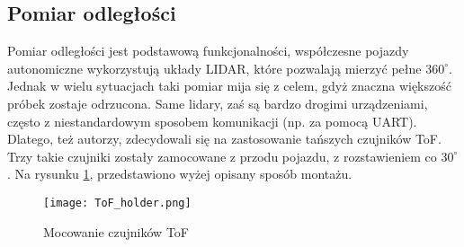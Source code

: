 
    \subsection{Pomiar odległości}
        Pomiar odległości jest podstawową funkcjonalności, współczesne pojazdy autonomiczne wykorzystują układy LIDAR, które pozwalają mierzyć pełne $360^\circ$.
        Jednak w wielu sytuacjach taki pomiar mija się z celem, gdyż znaczna większość próbek zostaje odrzucona.
        Same lidary, zaś są bardzo drogimi urządzeniami, często z niestandardowym sposobem komunikacji (np. za pomocą UART). 
        Dlatego, też autorzy, zdecydowali się na zastosowanie tańszych czujników ToF.
        Trzy takie czujniki zostały zamocowane z przodu pojazdu, z rozstawieniem co $30^\circ$.
        Na rysunku \ref{fig:ToF_holder}, przedstawiono wyżej opisany sposób montażu.
        \begin{figure}[!ht]
            \centering
            \texttt{[image: ToF\_holder.png]}
            \caption{Mocowanie czujników ToF}
            \label{fig:ToF_holder}
        \end{figure}
